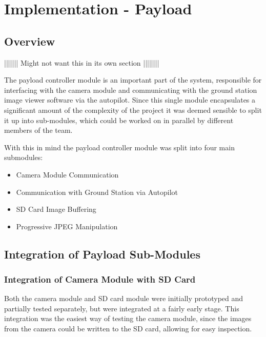 \chapter{Implementation - Payload}
\label{chap:implementation}

\section{Overview}
||||||| Might not want this in its own section ||||||||

The payload controller module is an important part of the system, responsible
for interfacing with the camera module and communicating with the ground 
station image viewer software via the autopilot. Since this single module 
encapsulates a significant amount of the complexity of the project it was 
deemed sensible to split it up into sub-modules, which could be worked on in
parallel by different members of the team. 

With this in mind the payload controller module was split into four main 
submodules:

\begin{itemize}
	\item Camera Module Communication
	\item Communication with Ground Station via Autopilot
	\item SD Card Image Buffering
	\item Progressive JPEG Manipulation
\end{itemize}











\section{Integration of Payload Sub-Modules}


\subsection{Integration of Camera Module with SD Card}
Both the camera module and SD card module were initially prototyped and 
partially tested separately,
but were integrated at
a fairly early stage. This integration was the easiest way of testing the 
camera module, since the images from the camera could be written to the SD
card, allowing for easy inspection.

